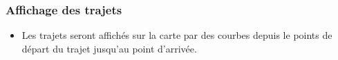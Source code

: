 \documentclass[12pt]{article}
\begin{document}
			\subsubsection{Affichage des trajets}
				\begin{itemize}
					\item Les trajets seront affichés sur la carte par des courbes depuis le points de départ du trajet jusqu'au point d'arrivée.
				\end{itemize}

\end{document}
